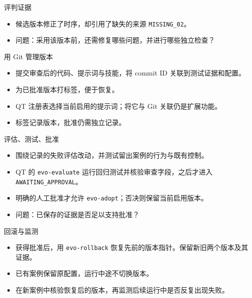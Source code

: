 \begin{frame}{评判证据\handsup}
\begin{center}
\small
\end{center}
\begin{itemize}
\item 候选版本修正了时序，却引用了缺失的来源 \texttt{MISSING\_02}。
\item 问题：采用该版本前，还需修复哪些问题，并进行哪些独立检查？
\end{itemize}
\end{frame}

\begin{frame}{用 Git 管理版本}
\begin{center}
\resizebox{.94\textwidth}{!}{}
\end{center}
\begin{itemize}
\item 提交审查后的代码、提示词与技能，将 commit ID 关联到测试证据和配置。
\item 为已批准版本打标签，便于恢复。
\item QT 注册表选择当前启用的提示词；将它与 Git 关联仍是扩展功能。
\item 标签记录版本，批准仍需独立记录。
\end{itemize}
\end{frame}

\begin{frame}{评估、测试、批准\handsup}
\begin{center}
\resizebox{.94\textwidth}{!}{}
\end{center}
\begin{itemize}
\item 围绕记录的失败评估改动，并测试留出案例的行为与既有控制。
\item QT 的 \texttt{evo-evaluate} 运行回归测试并核验审查字段，之后才进入 \texttt{AWAITING\_APPROVAL}。
\item 明确的人工批准才允许 \texttt{evo-adopt}；否决则保留当前启用版本。
\item 问题：已保存的证据是否足以支持批准？
\end{itemize}
\end{frame}

\begin{frame}{回滚与监测}
\begin{center}
\resizebox{.94\textwidth}{!}{}
\end{center}
\begin{itemize}
\item 获得批准后，用 \texttt{evo-rollback} 恢复先前的版本指针。保留新旧两个版本及其证据。
\item 已有案例保留原配置，运行中途不切换版本。
\item 在新案例中核验恢复后的版本，再监测后续运行中是否反复出现失败。
\end{itemize}
\end{frame}

